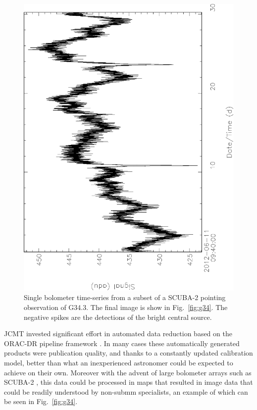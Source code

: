 \documentclass[final,authoryear,5p,times,twocolumn]{elsarticle}
\begin{document}
\begin{figure}[t]
\includegraphics[angle=-90,width=\columnwidth]{g34ts}
\caption{Single bolometer time-series from a subset of a SCUBA-2
  pointing observation of G34.3. The final image is show in
  Fig.~\ref{fig:g34}. The negative spikes are the detections of the
  bright central source.}
\label{fig:g34ts}
\end{figure}


JCMT invested significant effort in automated data reduction based on
the ORAC-DR pipeline framework
\citep[][]{1999ASPC..172...11E,1999ASPC..172..171J,2005ASPC..347..585G,2008ASPC..394..565J}. In
many cases these automatically generated products were publication
quality, and thanks to a constantly updated calibration model, better
than what an inexperienced astronomer could be expected to achieve on
their own. Moreover with the advent of large bolometer arrays such as
SCUBA-2 \citep{2013MNRAS.430.2513H}, this data could be processed in
maps that resulted in image data that could be readily understood by
non-submm specialists, an example of which can be seen in Fig.~\ref{fig:g34}.
\end{document}
